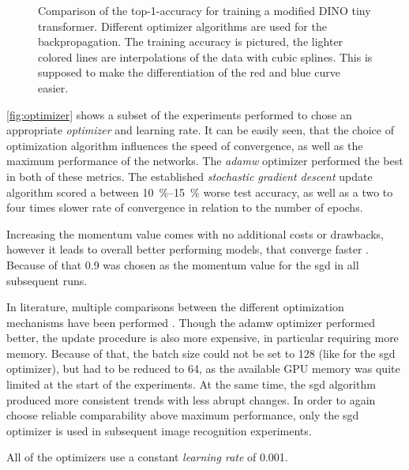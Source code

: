 \begin{figure}[htbp]
    \centering
    \caption{Comparison of the top-1-accuracy for training a modified DINO tiny transformer.
    Different optimizer algorithms are used for the backpropagation.
    The training accuracy is pictured, the lighter colored lines are interpolations of the data with cubic splines. 
    This is supposed to make the differentiation of the red and blue curve easier.
    }
    \label{fig:optimizer}
\end{figure}

\autoref{fig:optimizer} shows a subset of the experiments performed to chose an appropriate \emph{optimizer} and learning rate.
It can be easily seen, that the choice of optimization algorithm influences the speed of convergence, as well as the maximum performance of the networks.
The \emph{adamw} \cite{adamwOptimizer} optimizer performed the best in both of these metrics.
The established \emph{stochastic gradient descent} update algorithm scored a between \SIrange[]{10}{15}{\percent} worse test accuracy, as well as a two to four times slower rate of convergence in relation to the number of epochs.

Increasing the momentum value comes with no additional costs or drawbacks, however it leads to overall better performing models, that converge faster \cite{momentum}.
Because of that \SI{0.9}{} was chosen as the momentum value for the sgd in all subsequent runs.

In literature, multiple comparisons between the different optimization mechanisms have been performed \cite{sgdOrAdamw}.
Though the adamw optimizer performed better, the update procedure is also more expensive, in particular requiring more memory.
Because of that, the batch size could not be set to 128 (like for the sgd optimizer), but had to be reduced to 64, as the available GPU memory was quite limited at the start of the experiments.
At the same time, the sgd algorithm produced more consistent trends with less abrupt changes.
In order to again choose reliable comparability above maximum performance, only the sgd optimizer is used in subsequent image recognition experiments. 

All of the optimizers use a constant \emph{learning rate} of \SI[]{0.001}{}{}.